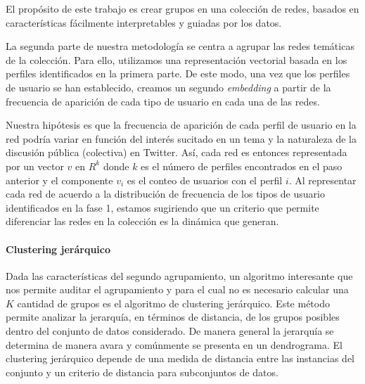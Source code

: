 El propósito de este trabajo es crear grupos en una colección de redes, basados en características fácilmente interpretables y guiadas por los datos. 

La segunda parte de nuestra metodología se centra a agrupar las redes temáticas de la colección. Para ello, utilizamos una representación vectorial basada en los perfiles identificados en la primera parte. De este modo, una vez que los perfiles de usuario se han establecido, creamos un segundo \textit{embedding} a partir de la frecuencia de aparición de cada tipo de usuario en cada una de las redes. 
 
Nuestra hipótesis es que la frecuencia de aparición de cada perfil de usuario en la red podría variar en función del interés sucitado en un tema y la naturaleza de la discusión pública (colectiva) en Twitter. Así, cada red es entonces representada por un vector $v$ en ${R}^k$ donde $k$ es el número de perfiles encontrados en el paso anterior y el componente $v_i$ es el conteo de usuarios con el perfil $i$. Al representar cada red de acuerdo a la distribución de frecuencia de los tipos de usuario identificados en la fase 1, estamos sugiriendo que un criterio que permite diferenciar las redes en la colección es la dinámica que generan. 


\paragraph{Clustering jerárquico}


Dada las características del segundo agrupamiento, un algoritmo interesante que nos permite auditar el agrupamiento y para el cual no es necesario calcular una $K$ cantidad de grupos es el algoritmo de clustering jerárquico. Este método permite analizar la jerarquía, en términos de distancia, de los grupos posibles dentro del conjunto de datos considerado. De manera general la jerarquía se determina de manera avara y comúnmente se presenta en un dendrograma. El clustering jerárquico depende de una medida de distancia entre las instancias del conjunto y un criterio de distancia para subconjuntos de datos. 

